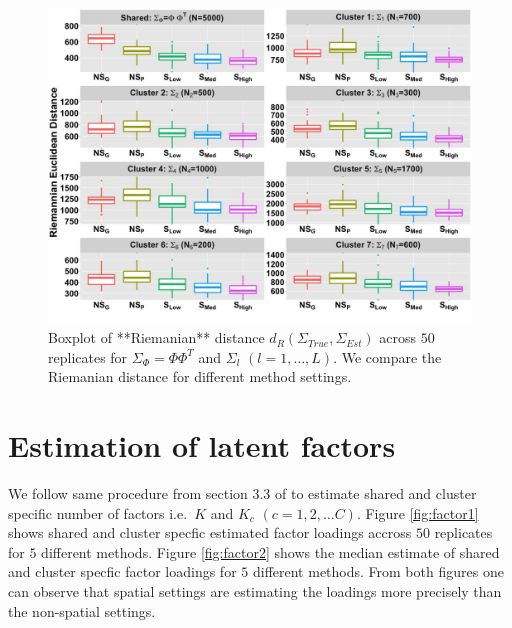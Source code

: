 \documentclass[
]{book}
\begin{document}
\begin{figure}

{\centering \includegraphics[width=0.8\linewidth]{images/Rei_Euclidean_plot} 

}

\caption{Boxplot of **Riemanian** distance $d_{R}( \Sigma_{True}, \Sigma_{Est})$ across  $50$ replicates for $\Sigma_{\Phi} = \Phi \Phi^{T}$ and $\Sigma_{l}$ $(l = 1, \dots , L)$. We compare the Riemanian distance for different method settings.}\label{fig:ReiEuclid}
\end{figure}

\hypertarget{estimation-of-latent-factors}{%
\section{Estimation of latent factors}\label{estimation-of-latent-factors}}

We follow same procedure from section 3.3 of \citet{de2018bayesian} to estimate shared and cluster specific number of factors i.e.~\(K\) and \(K_{c}\) \((c=1,2, \dots C)\). Figure \ref{fig:factor1} shows shared and cluster specfic estimated factor loadings accross \(50\) replicates for \(5\) different methods. Figure \ref{fig:factor2} shows the median estimate of shared and cluster specfic factor loadings for \(5\) different methods. From both figures one can observe that spatial settings are estimating the loadings more precisely than the non-spatial settings.
\end{document}
